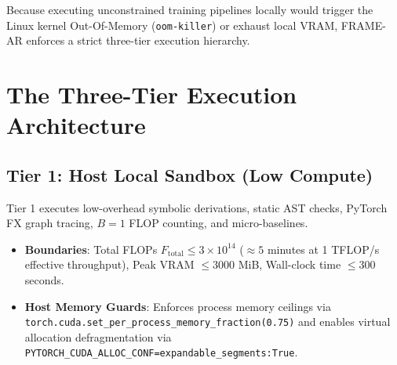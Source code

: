 \documentclass[11pt,a4paper]{article}
\begin{document}
Because executing unconstrained training pipelines locally would trigger the Linux kernel Out-Of-Memory (\texttt{oom-killer}) or exhaust local VRAM, FRAME-AR enforces a strict three-tier execution hierarchy.

\section{The Three-Tier Execution Architecture}

\subsection{Tier 1: Host Local Sandbox (Low Compute)}
Tier 1 executes low-overhead symbolic derivations, static AST checks, PyTorch FX graph tracing, $B=1$ FLOP counting, and micro-baselines.
\begin{itemize}[noitemsep]
    \item \textbf{Boundaries}: Total FLOPs $F_{\text{total}} \le 3 \times 10^{14}$ ($\approx 5$ minutes at 1 TFLOP/s effective throughput), Peak VRAM $\le 3000$ MiB, Wall-clock time $\le 300$ seconds.
    \item \textbf{Host Memory Guards}: Enforces process memory ceilings via \texttt{torch.cuda.set\_per\_process\_memory\_fraction(0.75)} and enables virtual allocation defragmentation via \texttt{PYTORCH\_CUDA\_ALLOC\_CONF=expandable\_segments:True}.
\end{itemize}
\end{document}

